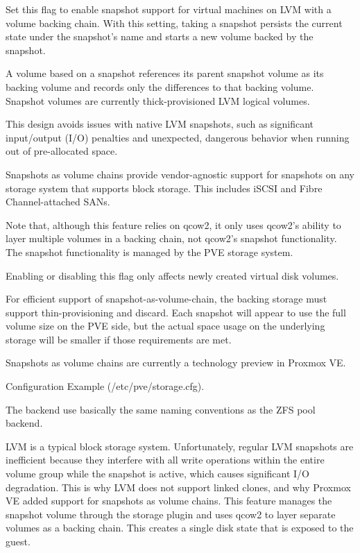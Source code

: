 Set this flag to enable snapshot support for virtual machines on LVM with a volume backing chain. With this setting, taking a snapshot persists the current state under the snapshot’s name and starts a new volume backed by the snapshot.

A volume based on a snapshot references its parent snapshot volume as its backing volume and records only the differences to that backing volume. Snapshot volumes are currently thick-provisioned LVM logical volumes.

This design avoids issues with native LVM snapshots, such as significant input/output (I/O) penalties and unexpected, dangerous behavior when running out of pre-allocated space.

Snapshots as volume chains provide vendor-agnostic support for snapshots on any storage system that supports block storage. This includes iSCSI and Fibre Channel-attached SANs.

Note that, although this feature relies on qcow2, it only uses qcow2’s ability to layer multiple volumes in a backing chain, not qcow2’s snapshot functionality. The snapshot functionality is managed by the PVE storage system.

Enabling or disabling this flag only affects newly created virtual disk volumes.

For efficient support of snapshot-as-volume-chain, the backing storage must support thin-provisioning and discard. Each snapshot will appear to use the full volume size on the PVE side, but the actual space usage on the underlying storage will be smaller if those requirements are met.

Snapshots as volume chains are currently a technology preview in Proxmox VE.

Configuration Example (/etc/pve/storage.cfg).

The backend use basically the same naming conventions as the ZFS pool backend.

LVM is a typical block storage system. Unfortunately, regular LVM snapshots are inefficient because they interfere with all write operations within the entire volume group while the snapshot is active, which causes significant I/O degradation. This is why LVM does not support linked clones, and why Proxmox VE added support for snapshots as volume chains. This feature manages the snapshot volume through the storage plugin and uses qcow2 to layer separate volumes as a backing chain. This creates a single disk state that is exposed to the guest.

